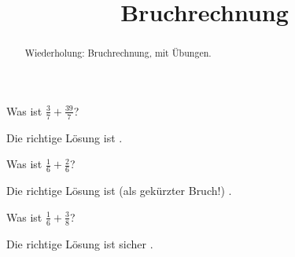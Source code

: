 \documentclass{ximera}
\title{Bruchrechnung}
\begin{document}
\begin{abstract}
Wiederholung: Bruchrechnung, mit Übungen.
\end{abstract}
\maketitle

\begin{question}
Was ist $\frac 37 + \frac{39}{7}$?
\begin{solution}
Die richtige Lösung ist
.
\end{solution}
\end{question}

\begin{question}
Was ist $\frac{1}{6} + \frac{2}{6}$?
\begin{solution}
Die richtige Lösung ist (als gekürzter Bruch!)
.
\end{solution}
\end{question}

\begin{question}
Was ist $\frac{1}{6} + \frac{3}{8}$?
\begin{solution}
Die richtige Lösung ist sicher
.
\end{solution}
\end{question}
\end{document}
